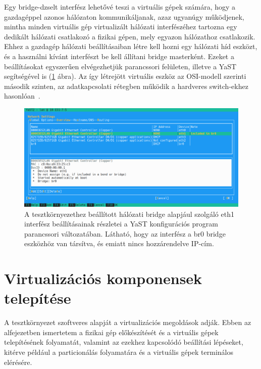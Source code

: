 Egy bridge-dzselt interfész lehetővé teszi a virtuális gépek számára, hogy a gazdagéppel azonos hálózaton kommunikáljanak, azaz ugyanúgy működjenek, mintha minden virtuális gép virtualizált hálózati interfészéhez tartozna egy dedikált hálózati csatlakozó a fizikai gépen, mely egyazon hálózathoz csatlakozik. Ehhez a gazdagép hálózati beállításaiban létre kell hozni egy hálózati híd eszközt, és a használni kívánt interfészt be kell állítani bridge masterként.
Ezeket a beállításokat egyszerűen elvégezhetjük parancssori felületen, illetve a YaST segítségével is (\ref{fig:yast-net-bridge} ábra). Az így létrejött virtuális eszköz az OSI-modell szerinti második szinten, az adatkapcsolati rétegben működik a hardveres switch-ekhez hasonlóan~\cite{SUSENetBridge}.

\begin{figure}[ht]
	\centering
	\includegraphics[width=15cm]{figures/yast-br0.png}
	\caption{A tesztkörnyezethez beállított hálózati bridge alapjául szolgáló eth1 interfész beállításainak részletei a YaST konfigurációs program parancssori változatában. Látható, hogy az interfész a br0 bridge eszközhöz van társítva, és emiatt nincs hozzárendelve IP-cím.}
	\label{fig:yast-net-bridge}
\end{figure}

\section{Virtualizációs komponensek telepítése}
A tesztkörnyezet szoftveres alapját a virtualizációs megoldások adják. Ebben az alfejezetben ismertetem a fizikai gép előkészítését és a virtuális gépek telepítésének folyamatát, valamint az ezekhez kapcsolódó beállítási lépéseket, kitérve például a particionálás folyamatára és a virtuális gépek terminálos elérésére.

